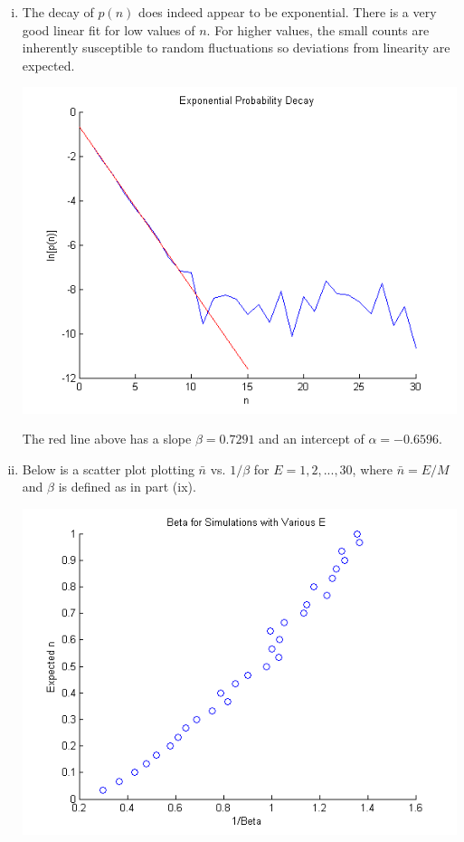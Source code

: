 \documentclass{article}
\begin{document}
\begin{enumerate}[i.]
  \item The decay of $p(n)$ does indeed appear to be exponential. There is a very good linear fit for low values of $n$. For higher values, the small counts are inherently susceptible to random fluctuations so deviations from linearity are expected.
    \begin{center}
      \includegraphics[scale=0.5]{prob2part9}
    \end{center}
    The red line above has a slope $\beta = 0.7291$ and an intercept of $\alpha = -0.6596$.

  \item Below is a scatter plot plotting $\bar{n}$ vs. $1/\beta$ for $E = 1, 2,..., 30$, where $\bar{n} = E / M$ and $\beta$ is defined as in part (ix).
    \begin{center}
      \includegraphics[scale=0.5]{prob2part10}
    \end{center}
    

\end{enumerate}
\end{document}
